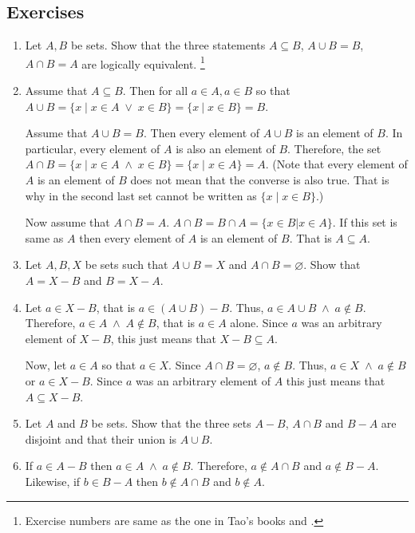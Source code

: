 \subsection{Exercises}
\begin{enumerate}
\item[Ex 3.1.5 ] Let $A, B$ be sets. Show that the three statements $A
\subseteq B$, $A \cup B = B$, $A \cap B = A$ are logically equivalent.
\footnote{Exercise numbers are same as the one in Tao's books 
\cite{tao2014a1} and \cite{tao2014a2}.}
\item[Solution: ] Assume that $A \subseteq B$. Then for all $a \in A, a
\in B$ so that $A \cup B = \{x \;|\; x \in A \;\lor\; x \in B\} = 
\{x \:|\; x \in B\} = B$.

Assume that $A \cup B = B$. Then every element of $A \cup B$ is an element
of $B$. In particular, every element of $A$ is also an element of $B$. 
Therefore, the set $A \cap B = \{x \;|\; x \in A \;\land\; x \in B\} = 
\{x \;|\; x \in A\} = A$. (Note that every element of $A$ is an element of
$B$ does not mean that the converse is also true. That is why in the
second last set cannot be written as $\{x \;|\; x \in B\}$.)

Now assume that $A \cap B = A$. $A \cap B = B \cap A = \{x \in B | x \in
A\}$. If this set is same as $A$ then every element of $A$ is an element
of $B$. That is $A \subseteq A$.

\item[Ex 3.1.9 ] Let $A, B, X$ be sets such that $A \cup B = X$ and $A
\cap B = \varnothing$. Show that $A = X - B$ and $B = X - A$.
\item[Solution: ] Let $a \in X - B$, that is $a \in (A \cup B) - B$. Thus,
$a \in A \cup B \;\land\; a \notin B$. Therefore, $a \in A \;\land\; A 
\notin B$, that is $a \in A$ alone. Since $a$ was an arbitrary element
of $X - B$, this just means that $X - B \subseteq A$.

Now, let $a \in A$ so that $a \in X$. Since $A \cap B = \varnothing$, $a
\notin B$. Thus, $a \in X \;\land\; a \notin B$ or $a \in X - B$. Since
$a$ was an arbitrary element of $A$ this just means that $A \subseteq X -
B$.

\item[Ex 3.1.10 ] Let $A$ and $B$ be sets. Show that the three sets $A - 
B$, $A \cap B$ and $B - A$ are disjoint and that their union is $A \cup B$.
\item[Solution: ] If $a \in A - B$ then $a \in A \;\land\; a \notin B$. 
Therefore, $a \notin A \cap B$ and $a \notin B - A$. Likewise, if $b \in
B - A$ then $b \notin A \cap B$ and $b \notin A$.


\end{enumerate}
